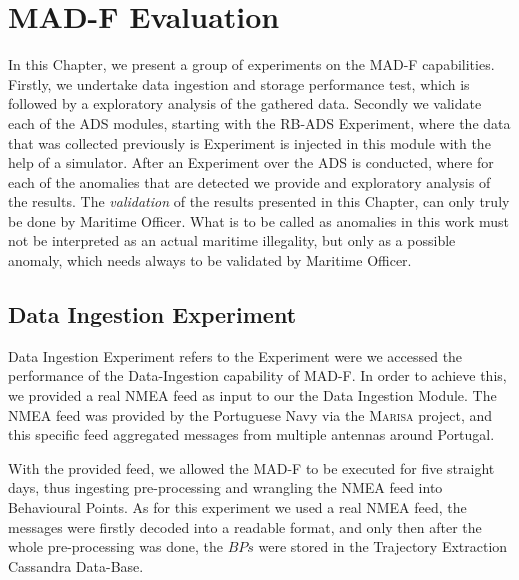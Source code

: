 \chapter{MAD-F Evaluation}
\label{chapter:Chapter 5}

In this Chapter, we present a group of experiments on the MAD-F capabilities. Firstly, we undertake data ingestion and storage performance test, which is followed by a exploratory analysis of the gathered data. Secondly we validate each of the ADS modules, starting with the RB-ADS Experiment, where the data that was collected previously is Experiment is injected in this module with the help of a simulator. After an Experiment over the ADS is conducted, where for each of the anomalies that are detected we provide and exploratory analysis of the results.
The \emph{validation} of the results presented in this Chapter, can only truly be done by Maritime Officer. What is to be called as anomalies in this work must not be interpreted as an actual maritime illegality, but only as a possible anomaly, which needs always to be validated by Maritime Officer.


\section{Data Ingestion Experiment}
\label{section: Experiment Data}
Data Ingestion Experiment refers to the Experiment were we accessed the performance of the Data-Ingestion capability of MAD-F. In order to achieve this, we provided a real NMEA feed as input to our the Data Ingestion Module. The NMEA feed was provided by the Portuguese Navy via the \textsc{Marisa} project, and this specific feed aggregated messages from multiple antennas around Portugal.
 
With the provided feed, we allowed the MAD-F to be executed for five straight days, thus ingesting pre-processing and wrangling the NMEA feed into Behavioural Points. As for this experiment we used a real NMEA feed, the messages were firstly decoded into a readable format, and only then after the whole pre-processing was done, the $BPs$ were stored in the Trajectory Extraction Cassandra Data-Base.

